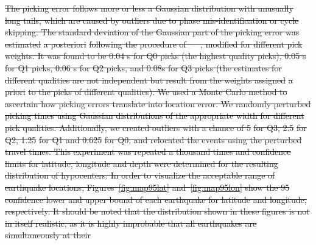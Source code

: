 \documentclass[jgrga]{agu2001} %
\newlength{\tw}
\providecommand{\DIFdel}[1]{{\protect\color{red}\sout{#1}}}                      %
\begin{document}
\begin{article}
\DIFdel{The picking error follows more or less a Gaussian distribution with
unusually long tails, which are caused by outliers due to phase mis-identification
or cycle skipping.   The standard deviation of the Gaussian
part of the picking
error was estimated }%
\DIFdel{a posteriori}%
\DIFdel{following the procedure of \mbox{%
\citet{wilcock91}
}%
,
modified for different pick weights.  It was found to be 0.04 s for
Q0 picks (the highest quality picks), 0.05 s for Q1 picks, 0.06 s for Q2 picks, and 0.08s
for Q3 picks (the estimates for different qualities are not
independent but result from the weights assigned }%
\DIFdel{a priori}%
\DIFdel{to the
picks of different qualities). We  used a Monte Carlo method to ascertain how picking errors
translate into location error. We randomly perturbed picking times
using Gaussian distributions of the appropriate width for different pick
qualities.  Additionally, we created outliers with
a chance of 5}%
\DIFdel{for Q3, 2.5}%
\DIFdel{for Q2, 1.25}%
\DIFdel{for Q1 and 0.625}%
\DIFdel{for
Q0, and relocated the events using the perturbed travel times. This
experiment was repeated a thousand times and confidence limits for
latitude, longitude and depth were determined for the resulting distribution of
hypocenters.  
 In order to visualize the acceptable range
of earthquake locations, Figures~\ref{fig:map95lat}
and~\ref{fig:map95lon} show the 95}%
\DIFdel{confidence lower and upper bound of each
earthquake for latitude and longitude, respectively. It should be
noted that the distribution shown in these figures is not in itself realistic, as it is
highly improbable that all earthquakes are simultaneously at their
}
\end{article}
\end{document}
